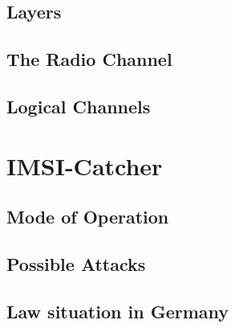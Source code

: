 \subsection{Layers}
\subsection{The Radio Channel}
\subsection{Logical Channels}
\section{IMSI-Catcher}
\label{sec:catcher}
\subsection{Mode of Operation}
\subsection{Possible Attacks}
\subsection{Law situation in Germany}






